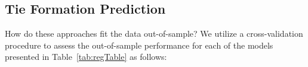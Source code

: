 \documentclass[9pt,twocolumn,twoside,lineno]{pnas-new}
\begin{document}
\subsection*{Tie Formation Prediction}

How do these approaches fit the data out-of-sample? We utilize a cross-validation procedure to assess the out-of-sample performance for each of the models presented in Table~\ref{tab:regTable} as follows:


	

\end{document}
